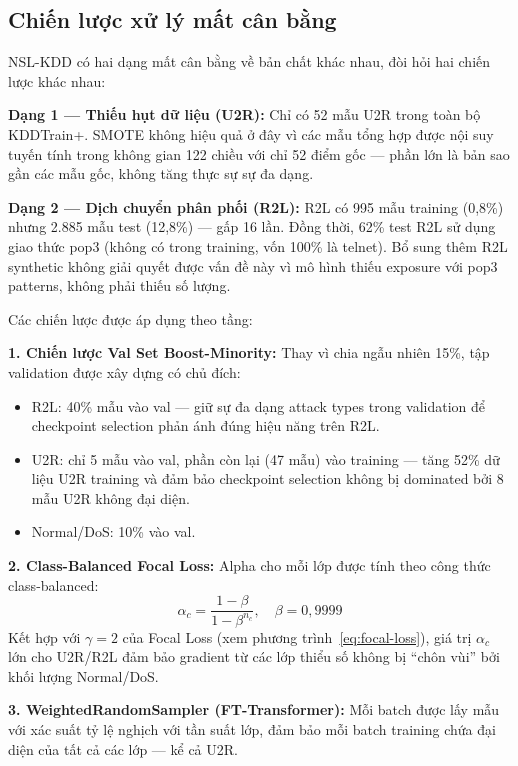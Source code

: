 \documentclass[../DoAn.tex]{subfiles}
\begin{document}
\subsection{Chiến lược xử lý mất cân bằng}
\label{subsec:gd1-imbalance}

NSL-KDD có hai dạng mất cân bằng về bản chất khác nhau, đòi hỏi hai chiến lược khác nhau:

\textbf{Dạng 1 --- Thiếu hụt dữ liệu (U2R):} Chỉ có 52 mẫu U2R trong toàn bộ KDDTrain+. SMOTE không hiệu quả ở đây vì các mẫu tổng hợp được nội suy tuyến tính trong không gian 122 chiều với chỉ 52 điểm gốc --- phần lớn là bản sao gần các mẫu gốc, không tăng thực sự sự đa dạng.

\textbf{Dạng 2 --- Dịch chuyển phân phối (R2L):} R2L có 995 mẫu training (0,8\%) nhưng 2.885 mẫu test (12,8\%) --- gấp 16 lần. Đồng thời, 62\% test R2L sử dụng giao thức pop3 (không có trong training, vốn 100\% là telnet). Bổ sung thêm R2L synthetic không giải quyết được vấn đề này vì mô hình thiếu exposure với pop3 patterns, không phải thiếu số lượng.

Các chiến lược được áp dụng theo tầng:

\textbf{1. Chiến lược Val Set Boost-Minority:} Thay vì chia ngẫu nhiên 15\%, tập validation được xây dựng có chủ đích:
\begin{itemize}
    \item R2L: 40\% mẫu vào val --- giữ sự đa dạng attack types trong validation để checkpoint selection phản ánh đúng hiệu năng trên R2L.
    \item U2R: chỉ 5 mẫu vào val, phần còn lại (47 mẫu) vào training --- tăng 52\% dữ liệu U2R training và đảm bảo checkpoint selection không bị dominated bởi 8 mẫu U2R không đại diện.
    \item Normal/DoS: 10\% vào val.
\end{itemize}

\textbf{2. Class-Balanced Focal Loss:} Alpha cho mỗi lớp được tính theo công thức class-balanced:
\begin{equation}
    \alpha_c = \frac{1 - \beta}{1 - \beta^{n_c}}, \quad \beta = 0{,}9999
    \label{eq:cb-alpha}
\end{equation}
Kết hợp với $\gamma = 2$ của Focal Loss (xem phương trình~\ref{eq:focal-loss}), giá trị $\alpha_c$ lớn cho U2R/R2L đảm bảo gradient từ các lớp thiểu số không bị ``chôn vùi'' bởi khối lượng Normal/DoS.

\textbf{3. WeightedRandomSampler (FT-Transformer):} Mỗi batch được lấy mẫu với xác suất tỷ lệ nghịch với tần suất lớp, đảm bảo mỗi batch training chứa đại diện của tất cả các lớp --- kể cả U2R.
\end{document}
